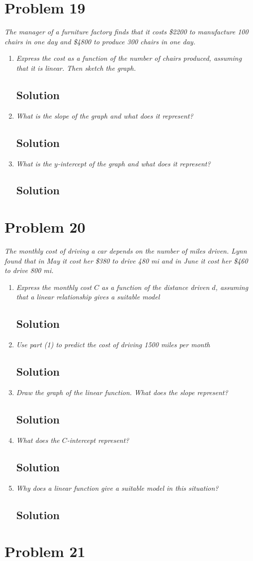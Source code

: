 \documentclass[11pt]{article}
\newcommand{\soln}{\subsection*}
\newcommand{\qn}{\textit}
\begin{document}
\section*{Problem 19}

\qn{The manager of a furniture factory finds that it costs \$2200 to manufacture 100 chairs in one day and \$4800 to produce 300 chairs in one day.}

\begin{enumerate}
	\item \qn{Express the cost as a function of the number of chairs produced, assuming that it is linear. Then sketch the graph.}
	\soln{Solution}
	
	\item \qn{What is the slope of the graph and what does it represent?}
	\soln{Solution}
	
	\item \qn{What is the $y$-intercept of the graph and what does it represent?}
	\soln{Solution}
\end{enumerate}

\section*{Problem 20}

\qn{The monthly cost of driving a car depends on the number of miles driven. Lynn found that in May it cost her \$380 to drive 480 mi and in June it cost her \$460 to drive 800 mi.}

\begin{enumerate}
	\item \qn{Express the monthly cost $C$ as a function of the distance driven $d$, assuming that a linear relationship gives a suitable model}
	\soln{Solution}
	
	\item \qn{Use part (1) to predict the cost of driving 1500 miles per month}
	\soln{Solution}
	
	\item \qn{Draw the graph of the linear function. What does the slope represent?}
	\soln{Solution}
	
	\item \qn{What does the $C$-intercept represent?}
	\soln{Solution}
	
	\item \qn{Why does a linear function give a suitable model in this situation?}
	\soln{Solution}
\end{enumerate}

\section*{Problem 21}
\end{document}
